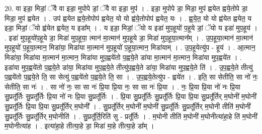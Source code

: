 \documentclass[17pt]{extarticle}
\begin{document}
20. वा इडा॒ मिडां॒ ॅवै वा इडा॒ मुपोपे डां॒ ॅवै वा इडा॒ मुप॑ । . इडा॒ मुपोपे डा॒ मिडा॒ मुप॑ ह्वयेत ह्वये॒तोपे डा॒ मिडा॒ मुप॑ ह्वयेत । . उप॑ ह्वयेत ह्वये॒तोपोप॑ ह्वयेत॒ यो यो ह्व॑ये॒तोपोप॑ ह्वयेत॒ यः । . ह्व॒ये॒त॒ यो यो ह्व॑येत ह्वयेत॒ य इडा॒ मिडां॒ ॅयो ह्व॑येत ह्वयेत॒ य इडा᳚म् । . य इडा॒ मिडां॒ ॅयो य इडा॑ मुप॒हूयो॑ प॒हूये डां॒ ॅयो य इडा॑ मुप॒हूय॑ । . इडा॑ मुप॒हूयो॑प॒हूये डा॒ मिडा॑ मुप॒हूया॒ त्मान॑ मा॒त्मान॑ मुप॒हूये डा॒ मिडा॑ मुप॒हूया॒त्मान᳚म् । . उ॒प॒हूया॒त्मान॑ मा॒त्मान॑ मुप॒हूयो॑ प॒हूया॒त्मान॒ मिडा॑या॒ मिडा॑या मा॒त्मान॑ मुप॒हूयो॑ प॒हूया॒त्मान॒ मिडा॑याम् । . उ॒प॒हूयेत्यु॑प - हूय॑ । . आ॒त्मान॒ मिडा॑या॒ मिडा॑या मा॒त्मान॑ मा॒त्मान॒ मिडा॑या मुप॒ह्वये॑तो प॒ह्वये॒ते डा॑या मा॒त्मान॑ मा॒त्मान॒ मिडा॑या मुप॒ह्वये॑त । . इडा॑या मुप॒ह्वये॑तो प॒ह्वये॒ते डा॑या॒ मिडा॑या मुप॒ह्वये॒ते तीत्यु॑प॒ह्वये॒ते डा॑या॒ मिडा॑या मुप॒ह्वये॒ते ति॑ । . उ॒प॒ह्वये॒ते तीत्यु॑ प॒ह्वये॑तो प॒ह्वये॒ते ति॒ सा सेत्यु॑ प॒ह्वये॑तो प॒ह्वये॒ते ति॒ सा । . उ॒प॒ह्वये॒तेत्यु॑प - ह्वये॑त । . इति॒ सा सेतीति॒ सा नो॑ नः॒ सेतीति॒ सा नः॑ । . सा नो॑ नः॒ सा सा नः॑ प्रि॒या प्रि॒या नः॒ सा सा नः॑ प्रि॒या । . नः॒ प्रि॒या प्रि॒या नो॑ नः प्रि॒या सु॒प्रतू᳚र्तिः सु॒प्रतू᳚र्तिः प्रि॒या नो॑ नः प्रि॒या सु॒प्रतू᳚र्तिः । . प्रि॒या सु॒प्रतू᳚र्तिः सु॒प्रतू᳚र्तिः प्रि॒या प्रि॒या सु॒प्रतू᳚र्तिर् म॒घोनी॑ म॒घोनी॑ सु॒प्रतू᳚र्तिः प्रि॒या प्रि॒या सु॒प्रतू᳚र्तिर् म॒घोनी᳚ । . सु॒प्रतू᳚र्तिर् म॒घोनी॑ म॒घोनी॑ सु॒प्रतू᳚र्तिः सु॒प्रतू᳚र्तिर् म॒घोनी तीति॑ म॒घोनी॑ सु॒प्रतू᳚र्तिः सु॒प्रतू᳚र्तिर् म॒घोनीति॑ । . सु॒प्रतू᳚र्ति॒रिति॑ सु - प्रतू᳚र्तिः । . म॒घोनी तीति॑ म॒घोनी॑ म॒घोनीत्या॑हा॒हे ति॑ म॒घोनी॑ म॒घोनीत्या॑ह । . इत्या॑हा॒हे तीत्या॒हे डा॒ मिडा॑ मा॒हे तीत्या॒हे डा᳚म् । \newline
\end{document}
